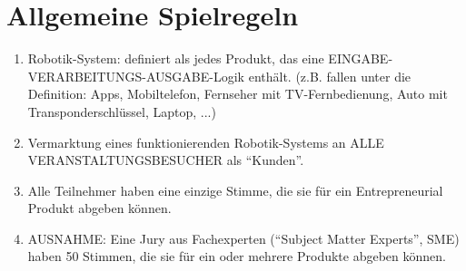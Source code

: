\documentclass[a4paper,12pt]{article}
\begin{document}
\section{Allgemeine Spielregeln}
\begin{enumerate}
	\item  Robotik-System: definiert als jedes Produkt, das eine
		EINGABE-VERARBEITUNGS-AUSGABE-Logik enthält. (z.B. fallen unter
		die Definition: Apps, Mobiltelefon, Fernseher mit
		TV-Fernbedienung, Auto mit Transponderschlüssel, Laptop, ...)
	\item Vermarktung eines funktionierenden Robotik-Systems an ALLE
		VERANSTALTUNGSBESUCHER als "`Kunden"'.
	\item Alle Teilnehmer haben eine einzige Stimme, die sie für ein
		Entrepreneurial Produkt abgeben können.
	\item AUSNAHME: Eine Jury aus Fachexperten ("`Subject Matter Experts"',
		SME) haben 50 Stimmen, die sie für ein oder mehrere Produkte
		abgeben können.
\end{enumerate}
\end{document}
